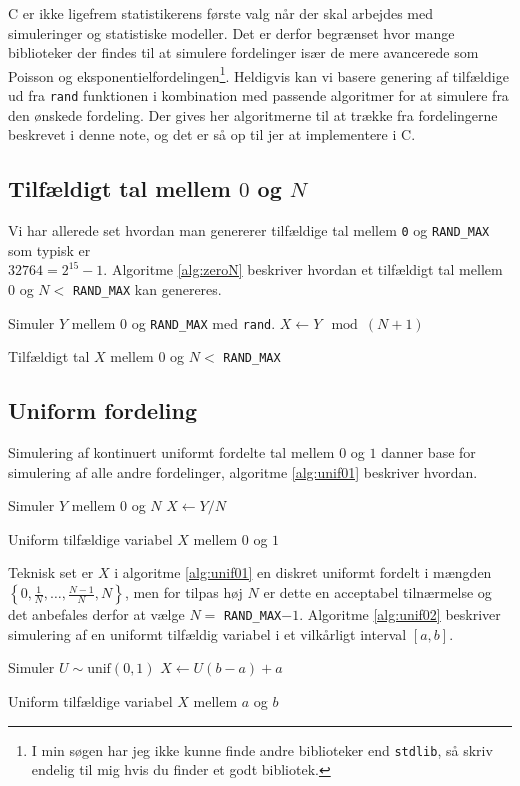 C er ikke ligefrem statistikerens første valg når der skal arbejdes med simuleringer og statistiske modeller. Det er derfor begrænset hvor mange biblioteker der findes til at simulere fordelinger især de mere avancerede som Poisson og eksponentielfordelingen\footnote{I min søgen har jeg ikke kunne finde andre biblioteker end \texttt{stdlib}, så skriv endelig til mig hvis du finder et godt bibliotek.}. Heldigvis kan vi basere genering af tilfældige ud fra \texttt{rand} funktionen i kombination med passende algoritmer for at simulere fra den ønskede fordeling. Der gives her algoritmerne til at trække fra fordelingerne beskrevet i denne note, og det er så op til jer at implementere i C. 
\subsection{Tilfældigt tal mellem $0$ og $N$}
Vi har allerede set hvordan man genererer tilfældige tal mellem \texttt{0} og \texttt{RAND\_MAX} som typisk er \\ 
$32764 = 2^{15} - 1$. Algoritme \ref{alg:zeroN} beskriver hvordan et tilfældigt tal mellem $0$ og $N < $ \texttt{RAND\_MAX} kan genereres.
\begin{algorithm}[H]
\begin{algorithmic}
\STATE Simuler $Y$ mellem $0$ og \texttt{RAND\_MAX} med \texttt{rand}. 
\STATE $X \gets Y \mod (N + 1)$ 
\end{algorithmic}
\caption{Tilfældigt tal $X$ mellem $0$ og $N <$ \texttt{RAND\_MAX}} \label{alg:zeroN}
\end{algorithm}
\subsection{Uniform fordeling}
Simulering af kontinuert uniformt fordelte tal mellem $0$ og $1$ danner base for simulering af alle andre fordelinger, algoritme \ref{alg:unif01} beskriver hvordan. 
\begin{algorithm}[H]
\begin{algorithmic}
\STATE Simuler $Y$ mellem $0$ og $N$
\STATE $X \gets Y/N$
\end{algorithmic}
\caption{Uniform tilfældige variabel $X$ mellem $0$ og $1$} \label{alg:unif01}
\end{algorithm}
Teknisk set er $X$ i algoritme \ref{alg:unif01} en diskret uniformt fordelt i mængden $\left\{0, \frac{1}{N},\dots,\frac{N-1}{N},N \right\}$, men for tilpas høj $N$ er dette en acceptabel tilnærmelse og det anbefales derfor at vælge $N = $ \texttt{RAND\_MAX}$ - 1$. Algoritme \ref{alg:unif02} beskriver simulering af en uniformt tilfældig variabel i et vilkårligt interval $[a,b]$. 
\begin{algorithm}[H]
\begin{algorithmic}
\STATE Simuler $U \sim \text{unif}(0,1)$
\STATE $X \gets U(b-a) + a$
\end{algorithmic}
\caption{Uniform tilfældige variabel $X$ mellem $a$ og $b$} \label{alg:unif02}
\end{algorithm}
